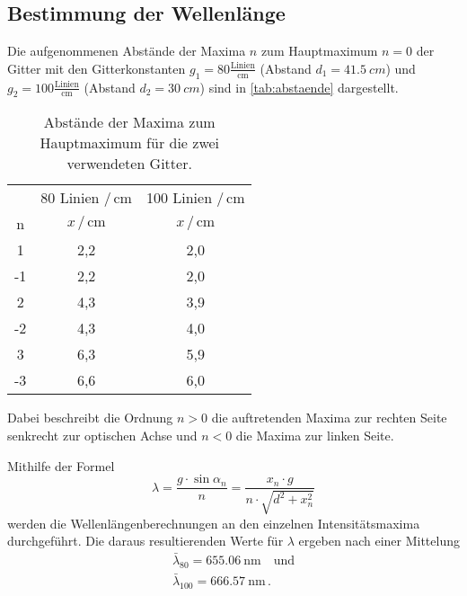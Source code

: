 \subsection{Bestimmung der Wellenlänge} \label{sec:lambda}
Die aufgenommenen Abstände der Maxima $n$ zum Hauptmaximum $n = 0$ der Gitter mit den Gitterkonstanten $g_1 = 80 \frac{\text{Linien}}{\unit{\centi\meter}}$ (Abstand $d_1 = \qty{41,5}{cm}$) und
$g_2 = 100 \frac{\text{Linien}}{\unit{\centi\meter}}$ (Abstand $d_2 = \qty{30}{cm}$) sind in \autoref{tab:abstaende} dargestellt.
\begin{table}
    \centering
    \caption{Abstände der Maxima zum Hauptmaximum für die zwei verwendeten Gitter.}
    \label{tab:abstaende}
    \begin{tabular}{c c c}
        \toprule
           &  80 Linien $/ \, \mathrm{cm}$ &  100 Linien $/ \, \mathrm{cm}$ \\
         n &  $x \, / \, \mathrm{cm}$ &  $x \, / \, \mathrm{cm}$ \\
        \midrule
         1 &     2,2 &       2,0 \\
        -1 &     2,2 &       2,0 \\
         2 &     4,3 &       3,9 \\
        -2 &     4,3 &       4,0 \\
         3 &     6,3 &       5,9 \\
        -3 &     6,6 &       6,0 \\
        \bottomrule
    \end{tabular}
\end{table}
Dabei beschreibt die Ordnung $n>0$ die auftretenden Maxima zur rechten Seite
senkrecht zur optischen Achse und $n<0$ die Maxima zur linken Seite.

Mithilfe der Formel
\begin{equation}
    \lambda=\frac{g \cdot \sin \alpha_n}{n} = \frac{x_n \cdot g}{n \cdot \sqrt{d^2+x_n^2}}
\end{equation} 
werden die Wellenlängenberechnungen an den einzelnen Intensitätsmaxima durchgeführt. 
Die daraus resultierenden Werte für $\lambda$ ergeben nach einer Mittelung
\begin{align*}
    \bar{\lambda}_{80} = \qty{655.06}{\nano\meter} \quad \text{und} \\
    \bar{\lambda}_{100} = \qty{666.57}{\nano\meter} \, .
\end{align*}
